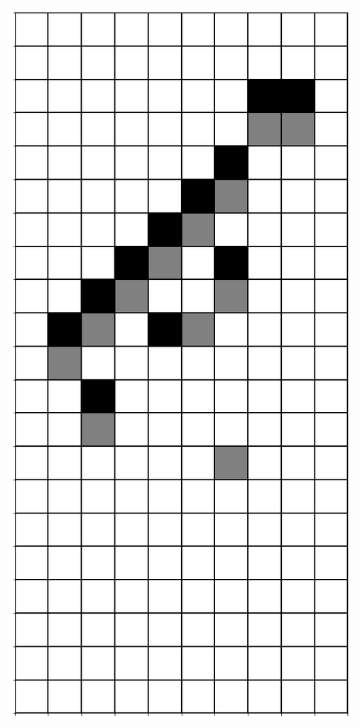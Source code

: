 \documentclass[12pt]{article}
\numberwithin{figure}{section} %
\begin{document}
\begin{figure}[H]
\begin{subfigure}{0.3\textwidth}
     		\subcaption{}
   	\end{subfigure}
     	\begin{subfigure}{0.3\textwidth}
     		\centering
     		\includegraphics[angle=270,width=\linewidth]{Section4/23.7}

\end{subfigure}
\end{figure}
\end{document}
